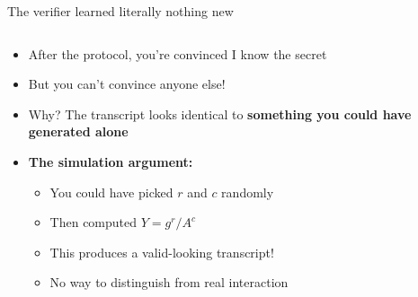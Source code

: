 \documentclass[aspectratio=169, lualatex, handout]{beamer}
\begin{document}
\begin{frame}{The verifier learned literally nothing new}
	\begin{columns}[c]
		\begin{column}{0.55\textwidth}
			\begin{itemize}
				\item After the protocol, you're convinced I know the secret
				\item But you can't convince anyone else!
				\item Why? The transcript looks identical to \textbf{something you could have generated alone}
				\item \textbf{The simulation argument:}
				      \begin{itemize}
					      \item You could have picked $r$ and $c$ randomly
					      \item Then computed $Y = g^r / A^c$
					      \item This produces a valid-looking transcript!
					      \item No way to distinguish from real interaction
				      \end{itemize}
			\end{itemize}
		\end{column}
		\begin{column}{0.45\textwidth}
		\end{column}
	\end{columns}
\end{frame}
\end{document}
